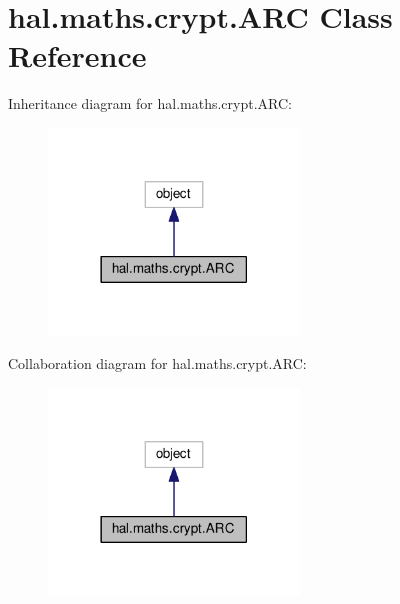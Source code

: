 \hypertarget{classhal_1_1maths_1_1crypt_1_1_a_r_c}{}\section{hal.\+maths.\+crypt.\+A\+RC Class Reference}
\label{classhal_1_1maths_1_1crypt_1_1_a_r_c}


Inheritance diagram for hal.\+maths.\+crypt.\+A\+RC\+:
\nopagebreak
\begin{figure}[H]
\begin{center}
\leavevmode
\includegraphics[width=189pt]{classhal_1_1maths_1_1crypt_1_1_a_r_c__inherit__graph}
\end{center}
\end{figure}


Collaboration diagram for hal.\+maths.\+crypt.\+A\+RC\+:
\nopagebreak
\begin{figure}[H]
\begin{center}
\leavevmode
\includegraphics[width=189pt]{classhal_1_1maths_1_1crypt_1_1_a_r_c__coll__graph}
\end{center}
\end{figure}
